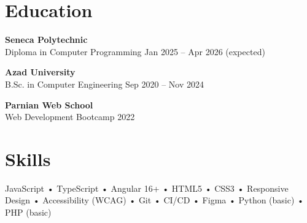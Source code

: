 \documentclass[letterpaper,11pt]{article}
\begin{document}
\vspace{0.6em}

\section*{Education}
\textbf{Seneca Polytechnic}\\
Diploma in Computer Programming \hfill Jan 2025 -- Apr 2026 (expected)

\textbf{Azad University}\\
B.Sc. in Computer Engineering \hfill Sep 2020 -- Nov 2024

\textbf{Parnian Web School}\\
Web Development Bootcamp \hfill 2022

\vspace{0.6em}

\section*{Skills}
JavaScript • TypeScript • Angular 16+ • HTML5 • CSS3 • Responsive Design • Accessibility (WCAG) • Git • CI/CD • Figma • Python (basic) • PHP (basic)
\end{document}
